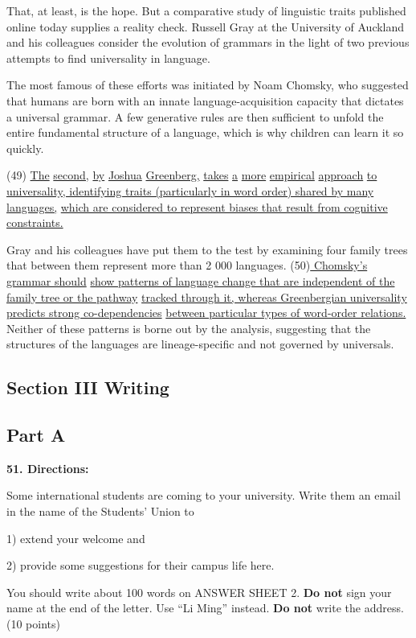 \documentclass[UTF8,11pt]{ctexart}
\begin{document}
That, at least, is the hope. But a comparative study of linguistic traits published online today supplies a reality check. Russell Gray at the University of Auckland and his colleagues consider the evolution of grammars in the light of two previous attempts to find universality in language.


The most famous of these efforts was initiated by Noam Chomsky, who suggested that humans are born with an innate language-acquisition capacity that dictates a universal grammar. A few generative rules are then sufficient to unfold the entire fundamental structure of a language, which is why children can learn it so quickly.


(49) \uline{The} \uline{second,} \uline{by} \uline{Joshua} \uline{Greenberg,} \uline{takes} \uline{a} \uline{more} \uline{empirical} \uline{approach} \uline{to} \uline{universality, identifying traits (particularly in word order) shared by many languages,} \uline{which are considered to represent biases that result from cognitive constraints.}


Gray and his colleagues have put them to the test by examining four family trees that between them represent more than 2 000 languages. (50)\uline{ Chomsky’s grammar should} \uline{show patterns of language change that are independent of the family tree or the pathway} \uline{tracked through it, whereas Greenbergian universality predicts strong co-dependencies} \uline{between particular types of word-order relations. }Neither of these patterns is borne out by the analysis, suggesting that the structures of the languages are lineage-specific and not governed by universals.


\subsection*{\textbf{Section III Writing}}


\subsection*{\textbf{Part A}}


\textbf{51. Directions:}


Some international students are coming to your university. Write them an email in the name of the Students’ Union to


1) extend your welcome and


2) provide some suggestions for their campus life here.


You should write about 100 words on ANSWER SHEET 2. \textbf{Do not} sign your name at the end of the letter. Use “Li Ming” instead. \textbf{Do not} write the address. (10 points)
\end{document}
